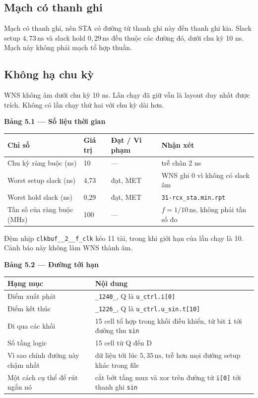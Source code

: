 \documentclass[12pt,a4paper]{article}
\begin{document}
\subsection{Mạch có thanh ghi}

Mạch có thanh ghi, nên STA có đường từ thanh ghi này đến thanh ghi kia. Slack setup \(4{,}73\,\mathrm{ns}\) và slack hold \(0{,}29\,\mathrm{ns}\) đều thuộc các đường đó, dưới chu kỳ 10 ns. Mạch này không phải mạch tổ hợp thuần.

\subsection{Không hạ chu kỳ}

WNS không âm dưới chu kỳ 10 ns. Lần chạy đã giữ vẫn là layout duy nhất được trích. Không có lần chạy thứ hai với chu kỳ dài hơn.

\noindent\textbf{Bảng 5.1 — Số liệu thời gian}

\begin{tabularx}{\textwidth}{|Y|Y|Y|Y|}
\hline
Chỉ số & Giá trị & Đạt / Vi phạm & Nhận xét \\ \hline
Chu kỳ ràng buộc (ns) & 10 & — & trễ chân 2 ns \\ \hline
Worst setup slack (ns) & 4{,}73 & đạt, MET & WNS ghi 0 vì không có slack âm \\ \hline
Worst hold slack (ns) & 0{,}29 & đạt, MET & \texttt{31-rcx\_sta.min.rpt} \\ \hline
Tần số của ràng buộc (MHz) & 100 & — & \(f = 1/10\,\mathrm{ns}\), không phải tần số đo \\ \hline
\end{tabularx}

Đệm nhịp \texttt{clkbuf\_\_2\_\_f\_clk} kéo 11 tải, trong khi giới hạn của lần chạy là 10. Cảnh báo này không làm WNS thành âm.

\noindent\textbf{Bảng 5.2 — Đường tới hạn}

\begin{tabularx}{\textwidth}{|l|Y|}
\hline
Hạng mục & Nội dung \\ \hline
Điểm xuất phát & \texttt{\_1240\_}, Q là \texttt{u\_ctrl.i[0]} \\ \hline
Điểm kết thúc & \texttt{\_1226\_}, Q là \texttt{u\_ctrl.u\_sin.t[10]} \\ \hline
Đi qua các khối & 15 cell tổ hợp trong khối điều khiển, từ bit \texttt{i} tới đường thu \texttt{sin} \\ \hline
Số tầng logic & 15 cell từ Q đến D \\ \hline
Vì sao chính đường này chậm nhất & dữ liệu tới lúc \(5{,}35\,\mathrm{ns}\), trễ hơn mọi đường setup khác trong file \\ \hline
Một cách cụ thể để rút ngắn nó & cắt bớt tầng mux và xor trên đường từ \texttt{i[0]} tới thanh ghi \texttt{sin} \\ \hline
\end{tabularx}
\end{document}
